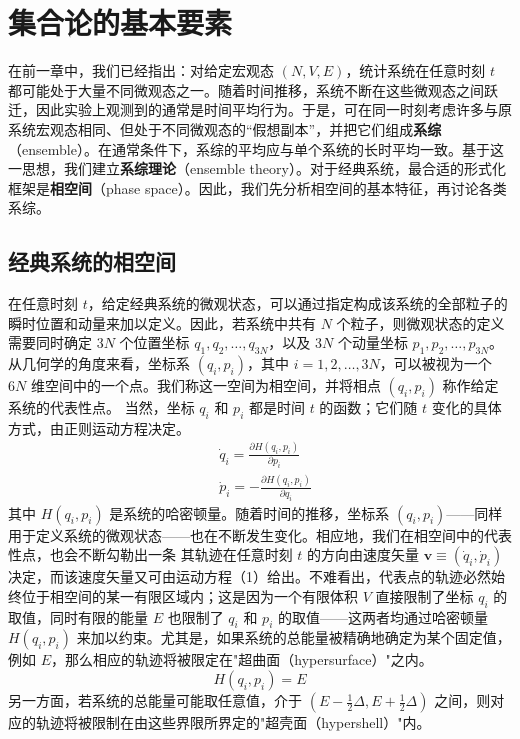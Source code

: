 ﻿\chapter{集合论的基本要素}\label{ux96c6ux5408ux8bbaux7684ux57faux672cux8981ux7d20}
在前一章中，我们已经指出：对给定宏观态 \((N,V,E)\)，统计系统在任意时刻 \(t\) 都可能处于大量不同微观态之一。随着时间推移，系统不断在这些微观态之间跃迁，因此实验上观测到的通常是时间平均行为。于是，可在同一时刻考虑许多与原系统宏观态相同、但处于不同微观态的“假想副本”，并把它们组成\textbf{系综}（ensemble）。在通常条件下，系综的平均应与单个系统的长时平均一致。基于这一思想，我们建立\textbf{系综理论}（ensemble theory）。对于经典系统，最合适的形式化框架是\textbf{相空间}（phase space）。因此，我们先分析相空间的基本特征，再讨论各类系综。

\section{经典系统的相空间}\label{ux7ecfux5178ux7cfbux7edfux7684ux76f8ux7a7aux95f4}

在任意时刻 \(t\)，给定经典系统的微观状态，可以通过指定构成该系统的全部粒子的瞬时位置和动量来加以定义。因此，若系统中共有 \(N\) 个粒子，则微观状态的定义需要同时确定 \(3N\) 个位置坐标 \(q_1, q_2, \ldots, q_{3N}\)，以及 \(3N\) 个动量坐标 \(p_1, p_2, \ldots, p_{3N}\)。从几何学的角度来看，坐标系 \((q_i, p_i)\)，其中 \(i = 1, 2, \ldots, 3N\)，可以被视为一个 \(6N\) 维空间中的一个点。我们称这一空间为相空间，并将相点 \((q_i, p_i)\) 称作给定系统的代表性点。
当然，坐标 \(q_{i}\) 和 \(p_{i}\) 都是时间 \(t\) 的函数；它们随 \(t\) 变化的具体方式，由正则运动方程决定。
\begin{equation}
    \tag{2.1.1}\label{eq:2.1.1}
    \begin{aligned}
        &\dot{q}_{i}=\frac{\partial H(q_{i},p_{i})}{\partial p_{i}}\\&\dot{p}_{i}=-\frac{\partial H(q_{i},p_{i})}{\partial q_{i}}
    \end{aligned}
\end{equation}
其中 \(H(q_{i},p_{i})\) 是系统的哈密顿量。随着时间的推移，坐标系 \((q_{i},p_{i})\)——同样用于定义系统的微观状态——也在不断发生变化。相应地，我们在相空间中的代表性点，也会不断勾勒出一条
其轨迹在任意时刻 \(t\) 的方向由速度矢量 \(\boldsymbol{v} \equiv (\dot{q}_{i}, \dot{p}_{i})\) 决定，而该速度矢量又可由运动方程（1）给出。不难看出，代表点的轨迹必然始终位于相空间的某一有限区域内；这是因为一个有限体积 \(V\) 直接限制了坐标 \(q_{i}\) 的取值，同时有限的能量 \(E\) 也限制了 \(q_{i}\) 和 \(p_{i}\) 的取值——这两者均通过哈密顿量 \(H(q_{i}, p_{i})\) 来加以约束。尤其是，如果系统的总能量被精确地确定为某个固定值，例如 \(E\)，那么相应的轨迹将被限定在"超曲面（hypersurface）"之内。
\begin{equation}\tag{2.1.2}\label{eq:2.1.2}
H ( q _ { i } , p _ { i } ) = E
\end{equation}
另一方面，若系统的总能量可能取任意值，介于 \((E-\frac{1}{2}\Delta, E+\frac{1}{2}\Delta)\) 之间，则对应的轨迹将被限制在由这些界限所界定的"超壳面（hypershell）"内。


